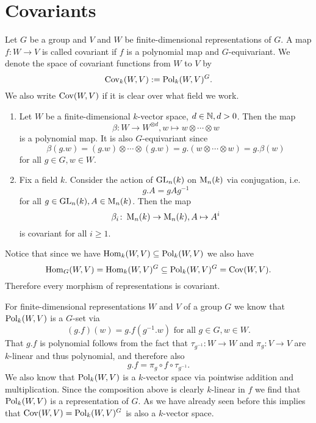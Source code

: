 \section{Covariants}


\begin{defi}
 Let $G$ be a group and $V$ and $W$ be finite-dimensional representations of $G$. A map $f \colon W \to V$ is called covariant if $f$ is a polynomial map and $G$-equivariant. We denote the space of covariant functions from $W$ to $V$ by
 \[
  \operatorname{Cov}_k(W,V) :=  \operatorname{Pol}_k(W,V)^G.
 \]
 We also write $\operatorname{Cov}(W,V)$ if it is clear over what field we work.
\end{defi}


\begin{expls}
 \begin{enumerate}\leavevmode
  \item
  Let $W$ be a finite-dimensional $k$-vector space, $d \in \mathbb{N}, d > 0$. Then the map
  \[
   \beta \colon W \to W^{\otimes d}, w \mapsto w \otimes \dotsb \otimes w
  \]
  is a polynomial map. It is also $G$-equivariant since
  \[
   \beta(g.w) = (g.w) \otimes \dotsb \otimes (g.w) = g.(w \otimes \dotsb \otimes w) = g.\beta(w)
  \]
  for all $g \in G, w \in W$.
  \item
  Fix a field $k$. Consider the action of $\operatorname{GL}_n(k)$ on $\operatorname{M}_n(k)$ via conjugation, i.e.
  \[
   g.A = gAg^{-1}
  \]
  for all $g \in \operatorname{GL}_n(k), A \in \operatorname{M}_n(k)$. Then the map
  \[
   \beta_i \colon \operatorname{M}_n(k) \to \operatorname{M}_n(k), A \mapsto A^i
  \]
  is covariant for all $i \geq 1$. 
 \end{enumerate}
\end{expls}


Notice that since we have $\operatorname{Hom}_k(W,V) \subseteq \operatorname{Pol}_k(W,V)$ we also have
\[
 \operatorname{Hom}_G(W,V) = \operatorname{Hom}_k(W,V)^G \subseteq \operatorname{Pol}_k(W,V)^G = \operatorname{Cov}(W,V).
\]
Therefore every morphism of representations is covariant.


For finite-dimensional representations $W$ and $V$ of a group $G$ we know that $\operatorname{Pol}_k(W,V)$ is a $G$-set via
\[
 (g.f)(w) = g.f\left(g^{-1}.w\right) \text{ for all } g \in G, w \in W.
\]
That $g.f$ is polynomial follows from the fact that $\tau_{g^{-1}} \colon W \to W$ and $\pi_g \colon V \to V$ are $k$-linear and thus polynomial, and therefore also
\[
 g.f = \pi_g \circ f \circ \tau_{g^{-1}}.
\]
We also know that $\operatorname{Pol}_k(W,V)$ is a $k$-vector space via pointwise addition and multiplication. Since the composition above is clearly $k$-linear in $f$ we find that $\operatorname{Pol}_k(W,V)$ is a representation of $G$. As we have already seen before this implies that $\operatorname{Cov}(W,V) = \operatorname{Pol}_k(W,V)^G$ is also a $k$-vector space.


